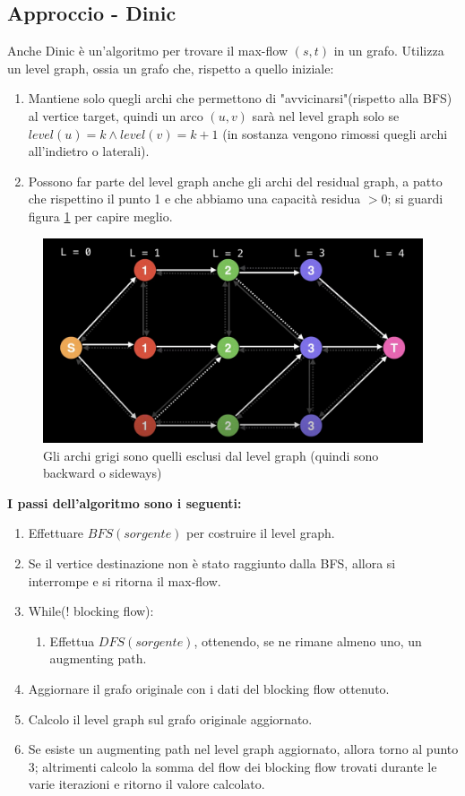 \documentclass[12pt,a4paper]{article}
\begin{document}
\subsection{Approccio - Dinic}
Anche Dinic è un'algoritmo per trovare il max-flow $(s, t)$ in un grafo. Utilizza un level graph, ossia un grafo che, rispetto a quello iniziale:
\begin{enumerate}
\item Mantiene solo quegli archi che permettono di "avvicinarsi"(rispetto alla BFS) al vertice target, quindi un arco $(u, v)$ sarà nel level graph solo se $level(u) = k \wedge level(v) = k + 1$ (in sostanza vengono rimossi quegli archi all'indietro o laterali).
\item Possono far parte del level graph anche gli archi del residual graph, a patto che  rispettino il punto 1 e che abbiamo una capacità residua $>0$; si guardi figura \ref{fig:level graph} per capire meglio.
\end{enumerate}
\begin{figure}[h]
	\centering
	\includegraphics[width=0.7\linewidth]{img/lvl_graph.png}
	\caption{Gli archi grigi sono quelli esclusi dal level graph (quindi sono backward o sideways)}
	\label{fig:level graph}
\end{figure}
\textbf{I passi dell'algoritmo sono i seguenti:}
\begin{enumerate}
\item Effettuare $BFS(sorgente)$ per costruire il level graph.
\item Se il vertice destinazione non è stato raggiunto dalla BFS, allora si interrompe e si ritorna il max-flow.
\item While(! blocking flow):
\begin{enumerate}
\item Effettua $DFS(sorgente)$, ottenendo, se ne rimane almeno uno, un augmenting path.
\end{enumerate}
\item Aggiornare il grafo originale con i dati del blocking flow ottenuto.
\item Calcolo il level graph sul grafo originale aggiornato.
\item Se esiste un augmenting path nel level graph aggiornato, allora torno al punto 3; altrimenti calcolo la somma del flow dei blocking flow trovati durante le varie iterazioni e ritorno il valore calcolato.
\end{enumerate}
\end{document}
